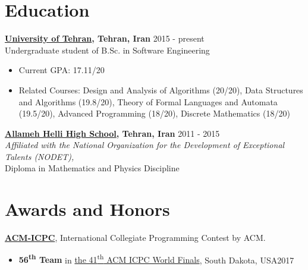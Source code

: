 \documentclass[margin]{res}
\begin{document}
 
 
 
\address{No. 14, Tanhajou Street, \\Tehranpars 3rd Square, \\Tehran, Iran, 1653984753}
\address{Cell: +98-919-6421171 \\ \href{mailto:shayan.hosseini@ut.ac.ir}{\texttt{shayan.hosseini@ut.ac.ir}} \\ 
		\href{http://www.shayanh.ir}{\texttt{http://www.shayanh.ir}}}

 
\begin{resume}

\section{Education}
    {\bf \href{http://ut.ac.ir/en}{University of Tehran}, Tehran, Iran} \hfill 2015 - present
    \\Undergraduate student of B.Sc. in Software Engineering
    
   	\begin{itemize}
	\item Current GPA: 17.11/20
	\item Related Courses: Design and Analysis of Algorithms (20/20), Data Structures and Algorithms (19.8/20),
	Theory of Formal Languages and Automata (19.5/20), Advanced Programming (18/20), Discrete Mathematics (18/20)
	\end{itemize}

    {\bf \href{http://www.helli.ir/}{Allameh Helli High School}, Tehran, Iran} \hfill 2011 - 2015
    \\\textit{\scriptsize Affiliated with the National Organization for the Development of Exceptional Talents (NODET),}
    \\Diploma in Mathematics and Physics Discipline

\section{Awards and Honors}
	{\bf \href{http://icpc.baylor.edu/}{ACM-ICPC}}, International Collegiate Programming Contest by ACM.
	\vspace{2mm}
	\begin{itemize}

	\item {\bf 56\textsuperscript{th} Team} in 
	\href{https://icpc.baylor.edu/community/results-2017}{the 41\textsuperscript{th} ACM ICPC World Finals}, 
	South Dakota, USA\hfill 2017


\end{itemize}
\end{resume}
\end{document}
